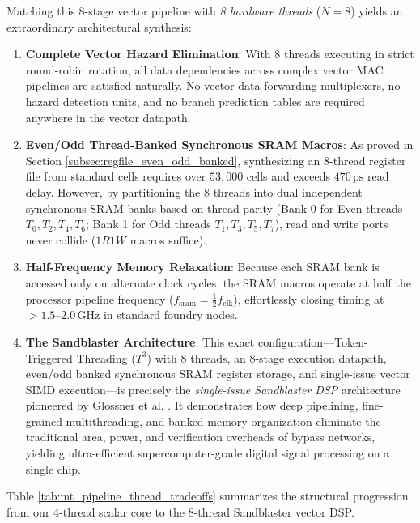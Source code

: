 Matching this 8-stage vector pipeline with \textit{8 hardware threads} ($N = 8$) yields an extraordinary architectural synthesis:
\begin{enumerate}
    \item \textbf{Complete Vector Hazard Elimination}: With 8 threads executing in strict round-robin rotation, all data dependencies across complex vector MAC pipelines are satisfied naturally. No vector data forwarding multiplexers, no hazard detection units, and no branch prediction tables are required anywhere in the vector datapath.
    \item \textbf{Even/Odd Thread-Banked Synchronous SRAM Macros}: As proved in Section \ref{subsec:regfile_even_odd_banked}, synthesizing an 8-thread register file from standard cells requires over $53,000$ cells and exceeds $470\,\text{ps}$ read delay. However, by partitioning the 8 threads into dual independent synchronous SRAM banks based on thread parity (Bank 0 for Even threads $T_0, T_2, T_4, T_6$; Bank 1 for Odd threads $T_1, T_3, T_5, T_7$), read and write ports never collide ($1R1W$ macros suffice).
    \item \textbf{Half-Frequency Memory Relaxation}: Because each SRAM bank is accessed only on alternate clock cycles, the SRAM macros operate at half the processor pipeline frequency ($f_{\text{sram}} = \frac{1}{2} f_{\text{clk}}$), effortlessly closing timing at $>1.5\text{--}2.0\,\text{GHz}$ in standard foundry nodes.
    \item \textbf{The Sandblaster Architecture}: This exact configuration---Token-Triggered Threading ($T^3$) with 8 threads, an 8-stage execution datapath, even/odd banked synchronous SRAM register storage, and single-issue vector SIMD execution---is precisely the \textit{single-issue Sandblaster DSP} architecture pioneered by Glossner et al. \cite{glossner2003sandblaster}. It demonstrates how deep pipelining, fine-grained multithreading, and banked memory organization eliminate the traditional area, power, and verification overheads of bypass networks, yielding ultra-efficient supercomputer-grade digital signal processing on a single chip.
\end{enumerate}

Table \ref{tab:mt_pipeline_thread_tradeoffs} summarizes the structural progression from our 4-thread scalar core to the 8-thread Sandblaster vector DSP.

